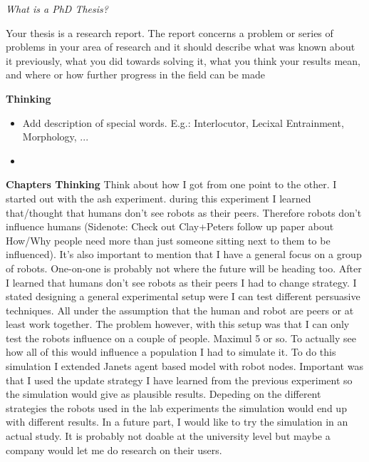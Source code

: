 \textit{What is a PhD Thesis?} 

Your thesis is a research report. The report concerns a problem or series of problems in your area of research and it should describe what was known about it previously, what you did towards solving it, what you think your results mean, and where or how further progress in the field can be made

\textbf{Thinking}
\begin{itemize}
\item Add description of special words. E.g.: Interlocutor, Lecixal Entrainment, Morphology, ...
\item
\end{itemize}

\textbf{Chapters Thinking}
Think about how I got from one point to the other. I started out with the ash experiment. during this experiment I learned that/thought that humans don't see robots as their peers. Therefore robots don't influence humans (Sidenote: Check out Clay+Peters follow up paper about How/Why people need more than just someone sitting next to them to be influenced). It's also important to mention that I have a general focus on a group of robots. One-on-one is probably not where the future will be heading too. After I learned that humans don't see robots as their peers I had to change strategy. I stated designing a general experimental setup were I can test different persuasive techniques. All under the assumption that the human and robot are peers or at least work together. The problem however, with this setup was that I can only test the robots influence on a couple of people. Maximul 5 or so. To actually see how all of this would influence a population I had to simulate it. To do this simulation I extended Janets agent based model with robot nodes. Important was that I used the update strategy I have learned from the previous experiment so the simulation would give as plausible results. Depeding on the different strategies the robots used in the lab experiments the simulation would end up with different results. 
In a future part, I would like to try the simulation in an actual study. It is probably not doable at the university level but maybe a company would let me do research on their users.
